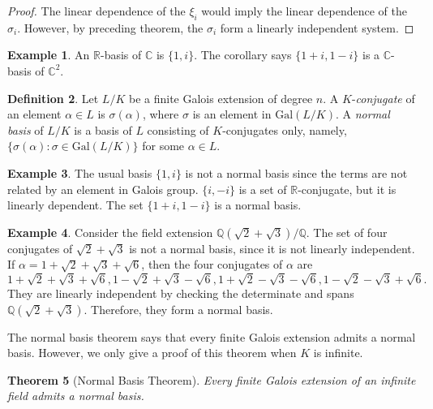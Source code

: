 \documentclass[12pt]{report}
\newtheorem{thm}{Theorem}[section]
\theoremstyle{definition}
\newtheorem{defn}[thm]{Definition}
\newtheorem{example}[thm]{Example}
\def\CC{\mathbb{C}}
\def\QQ{\mathbb{Q}}
\def\RR{\mathbb{R}}
\def\aa{\alpha}
\def\Gal{\text{Gal}}
\begin{document}
\begin{proof}
    The linear dependence of the $\xi_i$ would imply the linear dependence of the $\sigma_i$. However, by preceding theorem, the $\sigma_i$ form a linearly independent system.
\end{proof}

\begin{example}
    An $\RR$-basis of $\CC$ is $\{1,i\}$. The corollary says $\{1+i, 1-i\}$ is a $\CC$-basis of $\CC^2$.
\end{example}


\begin{defn}
    Let $L/K$ be a finite Galois extension of degree $n$. A $K$-\emph{conjugate} of an element $\aa\in L$ is $\sigma(\aa)$, where $\sigma$ is an element in $\Gal(L/K)$. A \emph{normal basis} of $L/K$ is a basis of $L$ consisting of $K$-conjugates only, namely,  $\{\sigma(\aa):\sigma\in \Gal(L/K)\}$ for some $\aa\in L$.
\end{defn}

\begin{example}
    The usual basis $\{1,i\}$ is not a normal basis since the terms are not related by an element in Galois group. $\{i,-i\}$ is a set of $\RR$-conjugate, but it is linearly dependent. The set $\{1+i,1-i\}$ is a normal basis.
\end{example}

\begin{example}
    Consider the field extension $\QQ(\sqrt{2}+\sqrt{3})/\QQ$. The set of four conjugates of $\sqrt{2}+\sqrt{3}$ is not a normal basis, since it is not linearly independent. If $\aa=1+\sqrt{2}+\sqrt{3}+\sqrt{6}$, then the four conjugates of $\aa$ are
    $$1+\sqrt{2}+\sqrt{3}+\sqrt{6},1-\sqrt{2}+\sqrt{3}-\sqrt{6},1+\sqrt{2}-\sqrt{3}-\sqrt{6},1-\sqrt{2}-\sqrt{3}+\sqrt{6}.$$ They are linearly independent by checking the determinate and spans $\QQ(\sqrt{2}+\sqrt{3})$. Therefore, they form a normal basis. 
\end{example}

The normal basis theorem says that every finite Galois extension admits a normal basis. However, we only give a proof of this theorem when $K$ is infinite.

\begin{thm}[Normal Basis Theorem]
    Every finite Galois extension of an infinite field admits a normal basis.
\end{thm}
\end{document}
